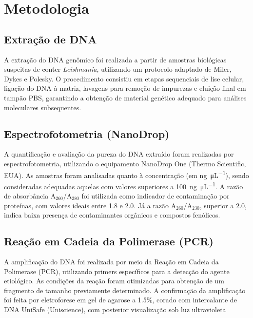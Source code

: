 \section{Metodologia}

\subsection{Extração de DNA}

A extração do DNA genômico foi realizada a partir de amostras biológicas
suspeitas de conter \textit{Leishmania}, utilizando um protocolo adaptado de
Miler, Dykes e Polesky\cite{SODEmiller1988}.  O procedimento consistiu em
etapas sequenciais de lise celular, ligação do DNA à matriz, lavagens para
remoção de impurezas e eluição final em tampão PBS, garantindo a obtenção de
material genético adequado para análises moleculares subsequentes.

\subsection{Espectrofotometria (NanoDrop)}

A quantificação e avaliação da pureza do DNA extraído foram realizadas por
espectrofotometria, utilizando o equipamento NanoDrop One (Thermo Scientific,
EUA). As amostras foram analisadas quanto à concentração (em
\unit{\nano\gram\per\micro\liter}), sendo consideradas adequadas aquelas com
valores superiores a \qty{100}{\nano\gram\per\micro\liter}. A razão de
absorbância A$_{260}$/A$_{280}$ foi utilizada como indicador de contaminação por
proteínas, com valores ideais entre \num{1,8} e \num{2.0}. Já a razão
A$_{260}$/A$_{230}$, superior a \num{2.0}, indica baixa presença de
contaminantes orgânicos e compostos fenólicos.

\subsection{Reação em Cadeia da Polimerase (PCR)}

A amplificação do DNA foi realizada por meio da Reação em Cadeia da Polimerase
(PCR), utilizando primers específicos para a detecção do agente etiológico. As
condições da reação foram otimizadas para obtenção de um fragmento de tamanho
previamente determinado. A confirmação da amplificação foi feita por
eletroforese em gel de agarose a \num{1.5}\%, corado com intercalante de DNA UniSafe
(Uniscience), com posterior visualização sob luz ultravioleta

